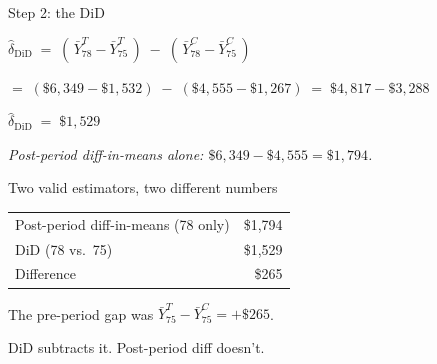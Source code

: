 \documentclass[11pt,aspectratio=169]{beamer}
\begin{document}
\begin{frame}{Step 2: the DiD}
\vspace{1em}
\begin{center}
$\widehat{\delta}_{\text{DiD}} \;=\; (\,\bar Y^T_{78} - \bar Y^T_{75}\,) \;-\; (\,\bar Y^C_{78} - \bar Y^C_{75}\,)$
\end{center}
\vspace{0.6em}
\begin{center}
\small
$=\; (\$6{,}349 - \$1{,}532) \;-\; (\$4{,}555 - \$1{,}267) \;=\; \$4{,}817 - \$3{,}288$
\end{center}
\vspace{0.6em}
\begin{center}
\Large
$\widehat{\delta}_{\text{DiD}} \;=\; \$1{,}529$
\end{center}
\vspace{0.6em}
\begin{center}
\small\color{warmgray}\itshape
Post-period diff-in-means alone: \;$\$6{,}349 - \$4{,}555 = \$1{,}794$.
\end{center}
\end{frame}

\begin{frame}{Two valid estimators, two different numbers}
\vspace{0.8em}
\begin{center}
\small
\renewcommand{\arraystretch}{1.3}
\begin{tabular}{@{}lr@{}}
\toprule
Post-period diff-in-means \;(78 only)        & \$1{,}794 \\
DiD \;(78 vs.\ 75)                            & \$1{,}529 \\
\midrule
Difference                                    & \$\phantom{1{,}}265 \\
\bottomrule
\end{tabular}
\end{center}
\vspace{0.6em}
\begin{center}
\large
The pre-period gap was \;$\bar Y^T_{75} - \bar Y^C_{75} = +\$265$.
\end{center}
\vspace{0.6em}
\begin{center}
\large
DiD subtracts it. \;Post-period diff doesn't.
\end{center}
\end{frame}
\end{document}
